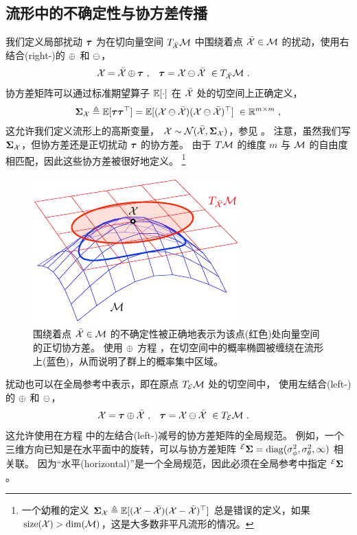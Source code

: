 \subsection[Uncertainty, covariances]{流形中的不确定性与协方差传播}

我们定义局部扰动 ${\bm \tau}$ 为在切向量空间 $T_{\bar{\mathcal{X}}}{\mathcal{M}}$ 中围绕着点 $\bar{\mathcal{X}}\in\mathcal{M}$ 的扰动，使用右结合(right-)的 $\oplus$ 和 $\ominus$，
%
\begin{align}\label{equ:uncertainty}
\mathcal{X} &= \bar{\mathcal{X}} \oplus {\bm \tau}~, & {\bm \tau} &=\mathcal{X} \ominus \bar{\mathcal{X}} ~\in T_{\bar{\mathcal{X}}}{\mathcal{M}}
~.
\end{align}
%
协方差矩阵可以通过标准期望算子 ${\mathbb E}[\cdot]$ 在 $\bar{\mathcal{X}}$ 处的切空间上正确定义，
%
\begin{align}\label{equ:cov}
{\bm \Sigma}_{\mathcal{X}} \triangleq {\mathbb E}[{\bm \tau}{\bm \tau}^{\top}] = {\mathbb E}[(\mathcal{X} \ominus \bar{\mathcal{X}})(\mathcal{X} \ominus \bar{\mathcal{X}})^{\top}]~\in{\mathbb R}^{m\times m}
~,
\end{align}
%
这允许我们定义流形上的高斯变量， $\mathcal{X}\sim\mathcal{N}(\bar{\mathcal{X}},{\bm \Sigma}_{\mathcal{X}})$，参见 。
注意，虽然我们写 ${\bm \Sigma}_{\mathcal{X}}$，但协方差还是正切扰动 ${\bm \tau}$ 的协方差。
由于 $T\mathcal{M}$ 的维度 $m$ 与 $\mathcal{M}$ 的自由度相匹配，因此这些协方差被很好地定义。%
%
\footnote{%
一个幼稚的定义 ${\bm \Sigma}_{\mathcal{X}} \triangleq {\mathbb E}[(\mathcal{X} - \bar{\mathcal{X}})(\mathcal{X} - \bar{\mathcal{X}})^{\top}]$ 总是错误的定义，如果 $\mathrm{size}(\mathcal{X})>\dim(\mathcal{M})$，这是大多数非平凡流形的情况。%
}

\begin{figure}[tb]
\centering
\includegraphics{figures/covariance}
\caption{围绕着点 $\bar{\mathcal{X}}\in\mathcal{M}$ 的不确定性被正确地表示为该点(红色)处向量空间的正切协方差。
使用 $\oplus$ 方程 ，在切空间中的概率椭圆被缠绕在流形上(蓝色)，从而说明了群上的概率集中区域。}
\label{fig:covariance}
\end{figure}




扰动也可以在全局参考中表示，即在原点 $T_{\mathcal{E}}{\mathcal{M}}$ 处的切空间中，
使用左结合(left-)的 $\oplus$ 和 $\ominus$，
%
\begin{align}\label{equ:uncertainty_left}
\mathcal{X} &= {\bm \tau}\oplus\bar{\mathcal{X}}~, & {\bm \tau} &=\mathcal{X} \ominus \bar{\mathcal{X}} ~\in T_{\mathcal{E}}{\mathcal{M}}
~.
\end{align}
%
这允许使用在方程  中的左结合(left-)减号的协方差矩阵的全局规范。
例如，一个三维方向已知是在水平面中的旋转，可以与协方差矩阵 $^{\mathcal{E}}{\bm \Sigma}=\operatorname*{diag}(\sigma_\phi^2,\sigma_\theta^2, \infty)$ 相关联。
因为“水平(horizontal)”是一个全局规范，因此必须在全局参考中指定 $^{\mathcal{E}}{\bm \Sigma}$ 。

